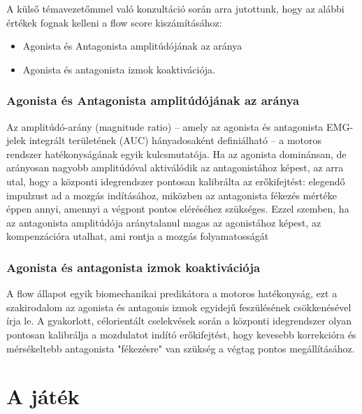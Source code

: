 A külső témavezetőmmel való konzultáció során arra jutottunk, hogy az alábbi értékek fognak kelleni a flow score kiszámításához:

\begin{itemize}
    \item Agonista és Antagonista amplitúdójának az aránya
    \item Agonista és antagonista izmok koaktivációja.
\end{itemize}

\subsubsection{Agonista és Antagonista amplitúdójának az aránya}

Az amplitúdó-arány (magnitude ratio) – amely az agonista és antagonista EMG-jelek integrált területének (AUC) hányadosaként definiálható – a motoros rendszer hatékonyságának egyik kulcsmutatója. Ha az agonista dominánsan, de arányosan nagyobb amplitúdóval aktiválódik az antagonistához képest, az arra utal, hogy a központi idegrendszer pontosan kalibrálta az erőkifejtést: elegendő impulzust ad a mozgás indításához, miközben az antagonista fékezés mértéke éppen annyi, amennyi a végpont pontos eléréséhez szükséges. \cite{amplitude1} Ezzel szemben, ha az antagonista amplitúdója aránytalanul magas az agonistához képest, az kompenzációra utalhat, ami rontja a mozgás folyamatosságát\cite{amplitude2}


\subsubsection{Agonista és antagonista izmok koaktivációja}

A flow állapot egyik biomechanikai predikátora a motoros hatékonyság, ezt a szakirodalom az agonista és antagonis izmok egyidejű feszülésének csökkenésével írja le. A gyakorlott, célorientált cselekvések során a központi idegrendszer olyan pontosan kalibrálja a mozdulatot indító erőkifejtést, hogy kevesebb korrekcióra és mérsékeltebb antagonista "fékezésre" van szükség a végtag pontos megállításához. \cite{coactivation2,coactivation3,coactivation5, coactivation4}










\section{A játék}

